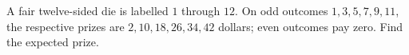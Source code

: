 A fair twelve-sided die is labelled $1$ through $12$. On odd outcomes $1,3,5,7,9,11$, the respective prizes are $2,10,18,26,34,42$ dollars; even outcomes pay zero. Find the expected prize.
